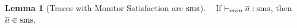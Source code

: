 \documentclass[dvipsnames,conference]{IEEEtran}
\theoremstyle{definition}
\newtheorem{lemma}{Lemma}[section]
\begin{document}


\begin{lemma}[Traces with Monitor Satisfaction are $\operatorname{sms}$]\label{lem:mon:smsafe}
  $\;\;$
  If $\vdash_{mon}{\overline{a}}:{\operatorname{sms}}$, then $\overline{a}\in\operatorname{sms}$. %
\end{lemma}
\end{document}

